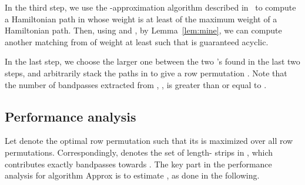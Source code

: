 \documentclass[11pt,twoside]{article}\usepackage{amssymb,latexsym,graphicx,hyperref}\usepackage{epstopdf}
\begin{document}
In the third step, we use the -approximation algorithm described in~\cite{PMM09} to compute a Hamiltonian path  in 
whose weight is at least  of the maximum weight of a Hamiltonian path.
Then, using  and , by Lemma~\ref{lem:mine},
we can compute another matching  from  of weight at least  such that  is guaranteed acyclic.

In the last step, we choose the larger one between the two 's found in the last two steps,
and arbitrarily stack the paths in  to give a row permutation .
Note that the number of bandpasses extracted from , , is greater than or equal to .


\subsection{Performance analysis}
Let  denote the optimal row permutation such that its  is maximized over all row permutations.
Correspondingly,  denotes the set of length- strips in , which contributes exactly  bandpasses towards .
The key part in the performance analysis for algorithm {\sc Approx} is to estimate , as done in the following.
\end{document}
